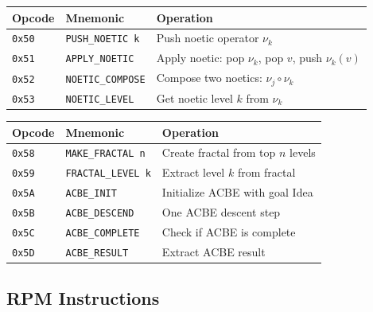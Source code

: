 \begin{definition}
\label{def:noetic-instructions}
\begin{center}
\begin{tabular}{llp{7cm}}
\toprule
\textbf{Opcode} & \textbf{Mnemonic} & \textbf{Operation} \\
\midrule
\texttt{0x50} & \texttt{PUSH\_NOETIC k} & Push noetic operator $\nu_k$ \\
\texttt{0x51} & \texttt{APPLY\_NOETIC} & Apply noetic: pop $\nu_k$, pop $v$, push $\nu_k(v)$ \\
\texttt{0x52} & \texttt{NOETIC\_COMPOSE} & Compose two noetics: $\nu_j \circ \nu_k$ \\
\texttt{0x53} & \texttt{NOETIC\_LEVEL} & Get noetic level $k$ from $\nu_k$ \\
\bottomrule
\end{tabular}
\end{center}
\end{definition}

\begin{definition}
\label{def:fractal-instructions}
\begin{center}
\begin{tabular}{llp{7cm}}
\toprule
\textbf{Opcode} & \textbf{Mnemonic} & \textbf{Operation} \\
\midrule
\texttt{0x58} & \texttt{MAKE\_FRACTAL n} & Create fractal from top $n$ levels \\
\texttt{0x59} & \texttt{FRACTAL\_LEVEL k} & Extract level $k$ from fractal \\
\texttt{0x5A} & \texttt{ACBE\_INIT} & Initialize ACBE with goal Idea \\
\texttt{0x5B} & \texttt{ACBE\_DESCEND} & One ACBE descent step \\
\texttt{0x5C} & \texttt{ACBE\_COMPLETE} & Check if ACBE is complete \\
\texttt{0x5D} & \texttt{ACBE\_RESULT} & Extract ACBE result \\
\bottomrule
\end{tabular}
\end{center}
\end{definition}

\subsection{RPM Instructions}
\label{subsec:rpm-instructions}

